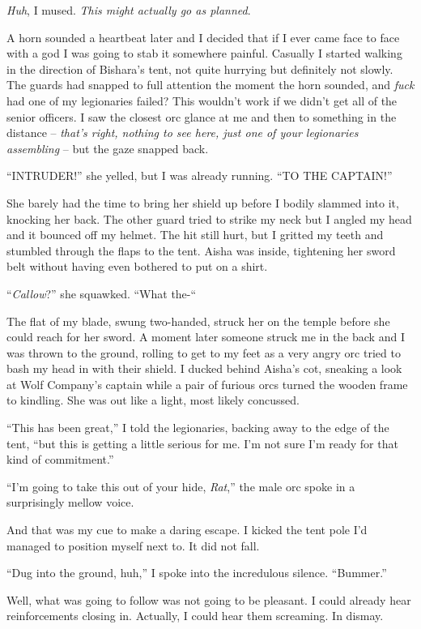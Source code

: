 \documentclass[12pt, openany]{book}
\begin{document}
\textit{Huh}, I mused. \textit{This might actually go as planned}.

A horn sounded a heartbeat later and I decided that if I ever came face to face with a god I was going to stab it somewhere painful. Casually I started walking in the direction of Bishara’s tent, not quite hurrying but definitely not slowly. The guards had snapped to full attention the moment the horn sounded, and \textit{fuck} had one of my legionaries failed? This wouldn’t work if we didn’t get all of the senior officers. I saw the closest orc glance at me and then to something in the distance – \textit{that’s right, nothing to see here, just one of your legionaries assembling} – but the gaze snapped back.

“INTRUDER!” she yelled, but I was already running. “TO THE CAPTAIN!”

She barely had the time to bring her shield up before I bodily slammed into it, knocking her back. The other guard tried to strike my neck but I angled my head and it bounced off my helmet. The hit still hurt, but I gritted my teeth and stumbled through the flaps to the tent. Aisha was inside, tightening her sword belt without having even bothered to put on a shirt.

“\textit{Callow}?” she squawked. “What the-“

The flat of my blade, swung two-handed, struck her on the temple before she could reach for her sword. A moment later someone struck me in the back and I was thrown to the ground, rolling to get to my feet as a very angry orc tried to bash my head in with their shield. I ducked behind Aisha’s cot, sneaking a look at Wolf Company’s captain while a pair of furious orcs turned the wooden frame to kindling. She was out like a light, most likely concussed.

“This has been great,” I told the legionaries, backing away to the edge of the tent, “but this is getting a little serious for me. I’m not sure I’m ready for that kind of commitment.”

“I’m going to take this out of your hide, \textit{Rat},” the male orc spoke in a surprisingly mellow voice.

And that was my cue to make a daring escape. I kicked the tent pole I’d managed to position myself next to. It did not fall.

“Dug into the ground, huh,” I spoke into the incredulous silence. “Bummer.”

Well, what was going to follow was not going to be pleasant. I could already hear reinforcements closing in. Actually, I could hear them screaming. In dismay.
\end{document}
